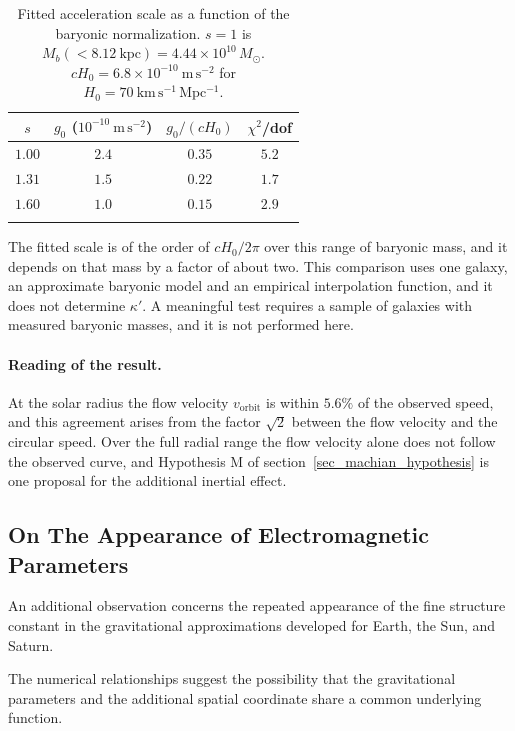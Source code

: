 \documentclass[pdflatex,sn-mathphys-num]{sn-jnl}%
\theoremstyle{thmstyleone}%
\theoremstyle{thmstyletwo}%
\theoremstyle{thmstylethree}%
\begin{document}
\begin{appendices}
\begin{table}[h]
\caption{Fitted acceleration scale as a function of the baryonic normalization. $s=1$ is $M_b(<8.12~\mathrm{kpc})=4.44\times10^{10}\,M_\odot$. $cH_0=6.8\times10^{-10}~\mathrm{m\,s^{-2}}$ for $H_0=70~\mathrm{km\,s^{-1}\,Mpc^{-1}}$.}%
\label{table_g0_fit}
\begin{tabular}{@{}cccc@{}}
\toprule
$s$ & $g_0$ ($10^{-10}~\mathrm{m\,s^{-2}}$) & $g_0/(cH_0)$ & $\chi^{2}$/dof\\
\midrule
$1.00$ & $2.4$ & $0.35$ & $5.2$\\
$1.31$ & $1.5$ & $0.22$ & $1.7$\\
$1.60$ & $1.0$ & $0.15$ & $2.9$\\
\botrule
\end{tabular}
\end{table}

The fitted scale is of the order of $cH_0/2\pi$ over this range of baryonic mass, and it depends on that mass by a factor of about two. This comparison uses one galaxy, an approximate baryonic model and an empirical interpolation function, and it does not determine $\kappa'$. A meaningful test requires a sample of galaxies with measured baryonic masses, and it is not performed here.

\paragraph{Reading of the result.} At the solar radius the flow velocity $v_{\mathrm{orbit}}$ is within $5.6\%$ of the observed speed, and this agreement arises from the factor $\sqrt{2}$ between the flow velocity and the circular speed. Over the full radial range the flow velocity alone does not follow the observed curve, and Hypothesis M of section~\ref{sec_machian_hypothesis} is one proposal for the additional inertial effect.

\subsection{On The Appearance of Electromagnetic Parameters}

An additional observation concerns the repeated appearance of the fine structure constant in the gravitational approximations developed for Earth, the Sun, and Saturn.

The numerical relationships suggest the possibility that the gravitational parameters and the additional spatial coordinate share a common underlying function.


\end{appendices}
\end{document}
